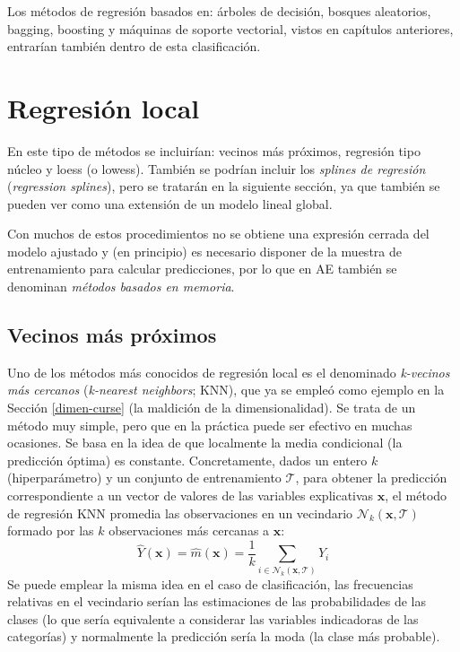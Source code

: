 \documentclass[
]{book}
\theoremstyle{break}
\theoremstyle{nonumberplain}
\begin{document}
Los métodos de regresión basados en: árboles de decisión, bosques aleatorios, bagging, boosting y máquinas de soporte vectorial, vistos en capítulos anteriores, entrarían también dentro de esta clasificación.

\hypertarget{reg-local}{%
\section{Regresión local}\label{reg-local}}

En este tipo de métodos se incluirían: vecinos más próximos, regresión tipo núcleo y loess (o lowess).
También se podrían incluir los \emph{splines de regresión} (\emph{regression splines}), pero se tratarán en la siguiente sección, ya que también se pueden ver como una extensión de un modelo lineal global.

Con muchos de estos procedimientos no se obtiene una expresión cerrada del modelo ajustado y (en principio) es necesario disponer de la muestra de entrenamiento para calcular predicciones, por lo que en AE también se denominan \emph{métodos basados en memoria}.

\hypertarget{reg-knn}{%
\subsection{Vecinos más próximos}\label{reg-knn}}

Uno de los métodos más conocidos de regresión local es el denominado \emph{k-vecinos más cercanos} (\emph{k-nearest neighbors}; KNN), que ya se empleó como ejemplo en la Sección \ref{dimen-curse} (la maldición de la dimensionalidad).
Se trata de un método muy simple, pero que en la práctica puede ser efectivo en muchas ocasiones.
Se basa en la idea de que localmente la media condicional (la predicción óptima) es constante.
Concretamente, dados un entero \(k\) (hiperparámetro) y un conjunto de entrenamiento \(\mathcal{T}\), para obtener la predicción correspondiente a un vector de valores de las variables explicativas \(\mathbf{x}\), el método de regresión KNN promedia las observaciones en un vecindario \(\mathcal{N}_k(\mathbf{x}, \mathcal{T})\) formado por las \(k\) observaciones más cercanas a \(\mathbf{x}\):
\[\hat{Y}(\mathbf{x}) = \hat{m}(\mathbf{x}) = \frac{1}{k} \sum_{i \in \mathcal{N}_k(\mathbf{x}, \mathcal{T})} Y_i\]
Se puede emplear la misma idea en el caso de clasificación, las frecuencias relativas en el vecindario serían las estimaciones de las probabilidades de las clases (lo que sería equivalente a considerar las variables indicadoras de las categorías) y normalmente la predicción sería la moda (la clase más probable).
\end{document}
